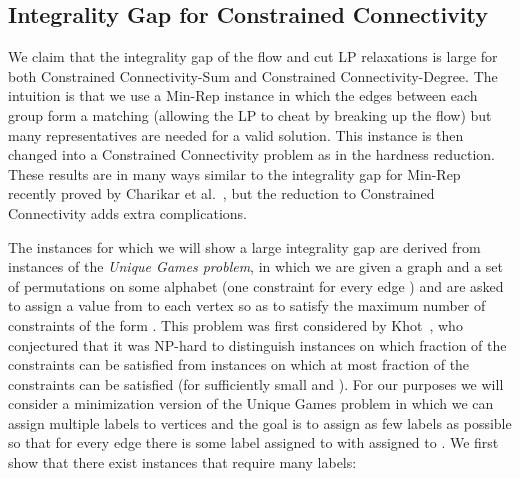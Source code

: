 \documentclass[11pt,letterpaper]{article}
\theoremstyle{definition}
\begin{document}
\subsection{Integrality Gap for Constrained Connectivity}


We claim that the integrality gap of the flow and cut LP relaxations is large for both {\sc
  Constrained Connectivity-Sum} and {\sc Constrained Connectivity-Degree}.  The intuition is that we use a {\sc Min-Rep} instance in which the edges between each group form a matching (allowing the LP to cheat by breaking up the flow) but many representatives are needed for a valid solution.  This instance is then changed into a Constrained Connectivity problem as in the hardness reduction.  These results are in many ways similar to the  integrality gap for {\sc Min-Rep} recently proved by Charikar et al.~\cite{CHK09}, but the reduction to Constrained Connectivity adds extra complications.

  The instances for
which we will show a large integrality gap are derived from instances
of the \emph{Unique Games problem}, in which we are given a graph
 and a set of permutations  on some alphabet
 (one constraint for every edge ) and are asked
to assign a value  from  to each vertex  so as to satisfy
the maximum number of constraints of the form .
This problem was first considered by Khot~\cite{khot:02}, who
conjectured that it was NP-hard to distinguish instances on which
 fraction of the constraints can be satisfied from instances
on which at most  fraction of the constraints can be
satisfied (for sufficiently small  and ).  For our
purposes we will consider a minimization version of the Unique Games
problem in which we can assign multiple labels to vertices and the
goal is to assign as few labels as possible so that for every edge
 there is some label  assigned to  with 
assigned to .  We first show that there exist instances that
require many labels:
\end{document}
